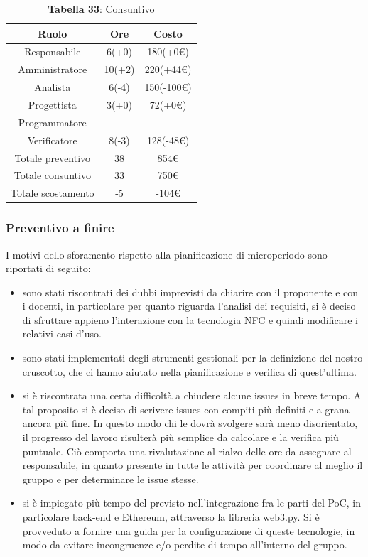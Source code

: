 \begin{table}[H]
	\centering
	\renewcommand{\arraystretch}{1.5}
	\begin{tabular}{|c|c|c|}
		\hline
		\rowcolor{lighter-grayer}
		Ruolo & Ore & Costo \\ \hline
		Responsabile & 6(+0) & 180(+0\euro) \\ \hline
		Amministratore & 10(+2) & 220(+44\euro) \\ \hline
		Analista & 6(-4) & 150(-100\euro) \\ \hline
		Progettista & 3(+0) & 72(+0\euro) \\ \hline
		Programmatore & - & - \\ \hline
		Verificatore & 8(-3) & 128(-48\euro) \\ \hline
		Totale preventivo & 38 & 854\euro \\ \hline
		Totale consuntivo & 33 & 750\euro \\ \hline
		Totale scostamento & -5 & -104\euro \\ \hline
	\end{tabular}
	\caption*{\textbf{Tabella 33}: Consuntivo\\}
\end{table}

\subsubsection{Preventivo a finire}

I motivi dello sforamento rispetto alla pianificazione di microperiodo sono riportati di seguito:
\begin{itemize}
	\item sono stati riscontrati dei dubbi imprevisti da chiarire con il proponente e con i docenti, in particolare 
	per quanto riguarda l'analisi dei requisiti, si è deciso di sfruttare appieno l'interazione con la tecnologia NFC e
	quindi modificare i relativi casi d'uso.
	\item sono stati implementati degli strumenti gestionali per la definizione del nostro cruscotto, che ci hanno aiutato nella pianificazione 
	e verifica di quest'ultima. 
	\item si è riscontrata una certa difficoltà a chiudere alcune issues in breve tempo. 
	A tal proposito si è deciso di scrivere issues con compiti più definiti e
	a grana ancora più fine. In questo modo 
	chi le dovrà svolgere sarà meno disorientato, il progresso del lavoro risulterà più semplice da calcolare
	e la verifica più puntuale. Ciò comporta una rivalutazione al rialzo delle ore da assegnare al responsabile, in quanto
	presente in tutte le attività per coordinare al meglio il gruppo e per determinare le issue stesse.
	\item si è impiegato più tempo del previsto nell'integrazione fra le parti del PoC, in particolare back-end e Ethereum, attraverso la libreria web3.py. Si è provveduto a fornire una guida per la configurazione di queste tecnologie, in modo da evitare incongruenze e/o perdite di tempo all'interno del gruppo.
\end{itemize}

